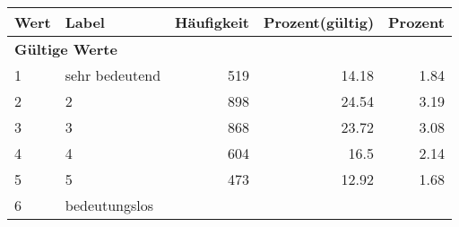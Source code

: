      \begin{longtable}{lXrrr}
     \toprule
     \textbf{Wert} & \textbf{Label} & \textbf{Häufigkeit} & \textbf{Prozent(gültig)} & \textbf{Prozent} \\
     \endhead
     \midrule
     \multicolumn{5}{l}{\textbf{Gültige Werte}}\\

     1 &
     \multicolumn{1}{X}{ sehr bedeutend   } &


       \num{519} &
       \num[round-mode=places,round-precision=2]{14.18} &
         \num[round-mode=places,round-precision=2]{1.84} \\

     2 &
     \multicolumn{1}{X}{ 2   } &


       \num{898} &
       \num[round-mode=places,round-precision=2]{24.54} &
         \num[round-mode=places,round-precision=2]{3.19} \\

     3 &
     \multicolumn{1}{X}{ 3   } &


       \num{868} &
       \num[round-mode=places,round-precision=2]{23.72} &
         \num[round-mode=places,round-precision=2]{3.08} \\

     4 &
     \multicolumn{1}{X}{ 4   } &


       \num{604} &
       \num[round-mode=places,round-precision=2]{16.5} &
         \num[round-mode=places,round-precision=2]{2.14} \\

     5 &
     \multicolumn{1}{X}{ 5   } &


       \num{473} &
       \num[round-mode=places,round-precision=2]{12.92} &
         \num[round-mode=places,round-precision=2]{1.68} \\

     6 &
     \multicolumn{1}{X}{ bedeutungslos   } &



\end{longtable}
